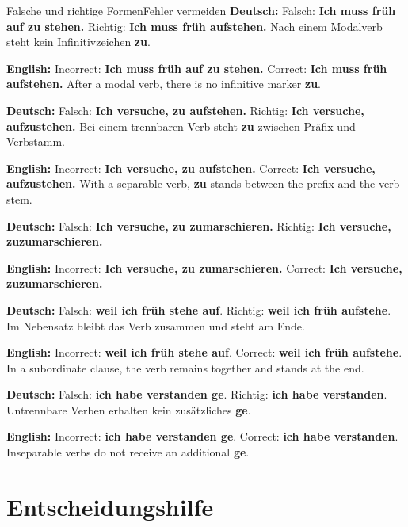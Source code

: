 \documentclass[a4paper,11pt]{article}
\newcommand{\GermanText}[1]{\textbf{Deutsch: }#1\par}
\newcommand{\EnglishText}[1]{{\small\color{SoftGray}\textbf{English: }#1\par}}
\begin{document}
        \begin{grammarentry}{Falsche und richtige Formen}{Fehler vermeiden}
            \GermanText{Falsch: \textbf{Ich muss früh auf zu stehen.} Richtig: \textbf{Ich muss früh aufstehen.} Nach einem Modalverb steht kein Infinitivzeichen \textbf{zu}.}
            \EnglishText{Incorrect: \textbf{Ich muss früh auf zu stehen.} Correct: \textbf{Ich muss früh aufstehen.} After a modal verb, there is no infinitive marker \textbf{zu}.}

            \GermanText{Falsch: \textbf{Ich versuche, zu aufstehen.} Richtig: \textbf{Ich versuche, aufzustehen.} Bei einem trennbaren Verb steht \textbf{zu} zwischen Präfix und Verbstamm.}
            \EnglishText{Incorrect: \textbf{Ich versuche, zu aufstehen.} Correct: \textbf{Ich versuche, aufzustehen.} With a separable verb, \textbf{zu} stands between the prefix and the verb stem.}

            \GermanText{Falsch: \textbf{Ich versuche, zu zumarschieren.} Richtig: \textbf{Ich versuche, zuzumarschieren.}}
            \EnglishText{Incorrect: \textbf{Ich versuche, zu zumarschieren.} Correct: \textbf{Ich versuche, zuzumarschieren.}}

            \GermanText{Falsch: \textbf{weil ich früh stehe auf}. Richtig: \textbf{weil ich früh aufstehe}. Im Nebensatz bleibt das Verb zusammen und steht am Ende.}
            \EnglishText{Incorrect: \textbf{weil ich früh stehe auf}. Correct: \textbf{weil ich früh aufstehe}. In a subordinate clause, the verb remains together and stands at the end.}

            \GermanText{Falsch: \textbf{ich habe verstanden ge}. Richtig: \textbf{ich habe verstanden}. Untrennbare Verben erhalten kein zusätzliches \textbf{ge}.}
            \EnglishText{Incorrect: \textbf{ich habe verstanden ge}. Correct: \textbf{ich habe verstanden}. Inseparable verbs do not receive an additional \textbf{ge}.}
        \end{grammarentry}


    \section{Entscheidungshilfe}
\end{document}
